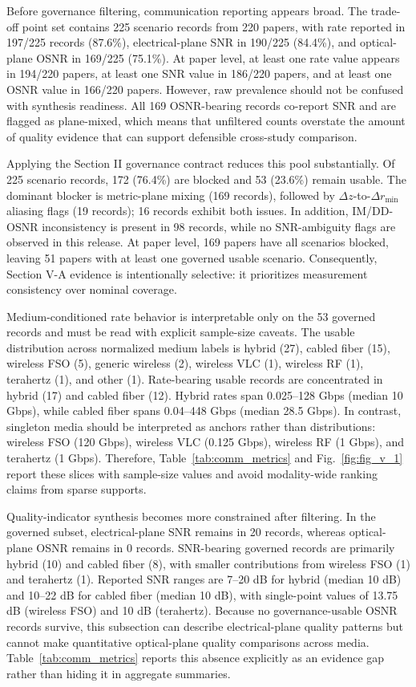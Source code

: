 \documentclass[lettersize,journal]{IEEEtran}
\begin{document}
Before governance filtering, communication reporting appears broad. The trade-off point set contains 225 scenario records from 220 papers, with rate reported in 197/225 records (87.6\%), electrical-plane SNR in 190/225 (84.4\%), and optical-plane OSNR in 169/225 (75.1\%). At paper level, at least one rate value appears in 194/220 papers, at least one SNR value in 186/220 papers, and at least one OSNR value in 166/220 papers. However, raw prevalence should not be confused with synthesis readiness. All 169 OSNR-bearing records co-report SNR and are flagged as plane-mixed, which means that unfiltered counts overstate the amount of quality evidence that can support defensible cross-study comparison.

Applying the Section II governance contract reduces this pool substantially. Of 225 scenario records, 172 (76.4\%) are blocked and 53 (23.6\%) remain usable. The dominant blocker is metric-plane mixing (169 records), followed by $\Delta z$-to-$\Delta r_{\min}$ aliasing flags (19 records); 16 records exhibit both issues. In addition, IM/DD-OSNR inconsistency is present in 98 records, while no SNR-ambiguity flags are observed in this release. At paper level, 169 papers have all scenarios blocked, leaving 51 papers with at least one governed usable scenario. Consequently, Section V-A evidence is intentionally selective: it prioritizes measurement consistency over nominal coverage.

Medium-conditioned rate behavior is interpretable only on the 53 governed records and must be read with explicit sample-size caveats. The usable distribution across normalized medium labels is hybrid (27), cabled fiber (15), wireless FSO (5), generic wireless (2), wireless VLC (1), wireless RF (1), terahertz (1), and other (1). Rate-bearing usable records are concentrated in hybrid (17) and cabled fiber (12). Hybrid rates span 0.025--128 Gbps (median 10 Gbps), while cabled fiber spans 0.04--448 Gbps (median 28.5 Gbps). In contrast, singleton media should be interpreted as anchors rather than distributions: wireless FSO (120 Gbps), wireless VLC (0.125 Gbps), wireless RF (1 Gbps), and terahertz (1 Gbps). Therefore, Table~\ref{tab:comm_metrics} and Fig.~\ref{fig:fig_v_1} report these slices with sample-size values and avoid modality-wide ranking claims from sparse supports.

Quality-indicator synthesis becomes more constrained after filtering. In the governed subset, electrical-plane SNR remains in 20 records, whereas optical-plane OSNR remains in 0 records. SNR-bearing governed records are primarily hybrid (10) and cabled fiber (8), with smaller contributions from wireless FSO (1) and terahertz (1). Reported SNR ranges are 7--20 dB for hybrid (median 10 dB) and 10--22 dB for cabled fiber (median 10 dB), with single-point values of 13.75 dB (wireless FSO) and 10 dB (terahertz). Because no governance-usable OSNR records survive, this subsection can describe electrical-plane quality patterns but cannot make quantitative optical-plane quality comparisons across media. Table~\ref{tab:comm_metrics} reports this absence explicitly as an evidence gap rather than hiding it in aggregate summaries.
\end{document}
